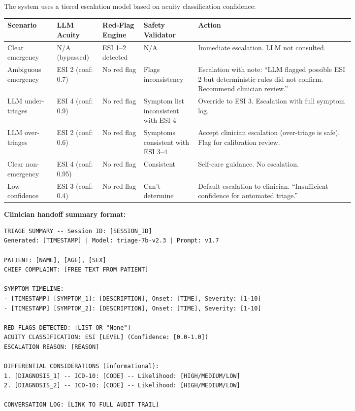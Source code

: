 The system uses a tiered escalation model based on acuity classification confidence:

{\small
\begin{tabular}{|p{0.12\linewidth}|p{0.1\linewidth}|p{0.1\linewidth}|p{0.12\linewidth}|p{0.38\linewidth}|}
\hline
\textbf{Scenario} & \textbf{LLM Acuity} & \textbf{Red-Flag Engine} & \textbf{Safety Validator} & \textbf{Action} \\
\hline
Clear emergency & N/A (bypassed) & ESI 1--2 detected & N/A & Immediate escalation. LLM not consulted. \\
\hline
Ambiguous emergency & ESI 2 (conf: 0.7) & No red flag & Flags inconsistency & Escalation with note: ``LLM flagged possible ESI 2 but deterministic rules did not confirm. Recommend clinician review.'' \\
\hline
LLM under-triages & ESI 4 (conf: 0.9) & No red flag & Symptom list inconsistent with ESI 4 & Override to ESI 3. Escalation with full symptom log. \\
\hline
LLM over-triages & ESI 2 (conf: 0.6) & No red flag & Symptoms consistent with ESI 3--4 & Accept clinician escalation (over-triage is safe). Flag for calibration review. \\
\hline
Clear non-emergency & ESI 4 (conf: 0.95) & No red flag & Consistent & Self-care guidance. No escalation. \\
\hline
Low confidence & ESI 3 (conf: 0.4) & No red flag & Can't determine & Default escalation to clinician. ``Insufficient confidence for automated triage.'' \\
\hline
\end{tabular}
}

\bigskip
\textbf{Clinician handoff summary format:}

\begin{verbatim}
TRIAGE SUMMARY -- Session ID: [SESSION_ID]
Generated: [TIMESTAMP] | Model: triage-7b-v2.3 | Prompt: v1.7

PATIENT: [NAME], [AGE], [SEX]
CHIEF COMPLAINT: [FREE TEXT FROM PATIENT]

SYMPTOM TIMELINE:
- [TIMESTAMP] [SYMPTOM_1]: [DESCRIPTION], Onset: [TIME], Severity: [1-10]
- [TIMESTAMP] [SYMPTOM_2]: [DESCRIPTION], Onset: [TIME], Severity: [1-10]

RED FLAGS DETECTED: [LIST OR "None"]
ACUITY CLASSIFICATION: ESI [LEVEL] (Confidence: [0.0-1.0])
ESCALATION REASON: [REASON]

DIFFERENTIAL CONSIDERATIONS (informational):
1. [DIAGNOSIS_1] -- ICD-10: [CODE] -- Likelihood: [HIGH/MEDIUM/LOW]
2. [DIAGNOSIS_2] -- ICD-10: [CODE] -- Likelihood: [HIGH/MEDIUM/LOW]

CONVERSATION LOG: [LINK TO FULL AUDIT TRAIL]
\end{verbatim}

